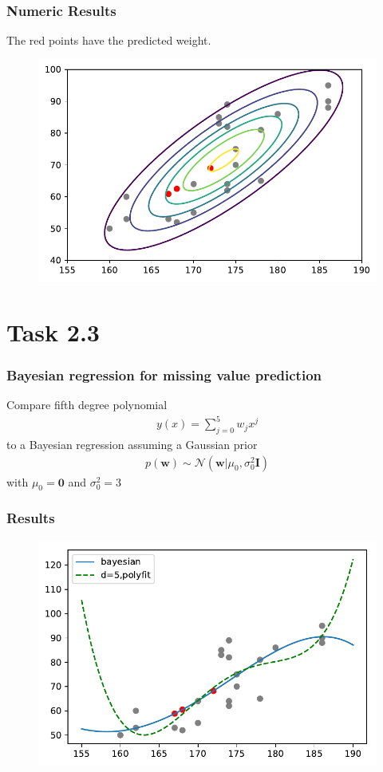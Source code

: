 \documentclass{beamer}
\begin{document}
\begin{frame}
	\frametitle{Numeric Results}
	The red points have the predicted weight.
	\begin{figure}
		\includegraphics[width=0.9\linewidth]{graphics/contours}
	\end{figure}
\end{frame}

\section{Task 2.3}

\begin{frame}
	\frametitle{Bayesian regression for missing value prediction}
	Compare fifth degree polynomial
	\begin{align*}
		y(x) = \sum_{j=0}^{5}w_jx^j
	\end{align*}
	to a Bayesian regression assuming a Gaussian prior
	\begin{align*}
		p(\mathbf{w}) \sim \mathcal{N}(\mathbf{w}|\mu_0,\sigma^2_0\mathbf{I})
	\end{align*}
	with $\mu_0=\mathbf{0}$ and $\sigma^2_0=3$
	
\end{frame}

\begin{frame}
	\frametitle{Results}
	\begin{figure}
		\includegraphics[height=0.8\textheight]{graphics/task3}
	\end{figure}
\end{frame}
\end{document}
